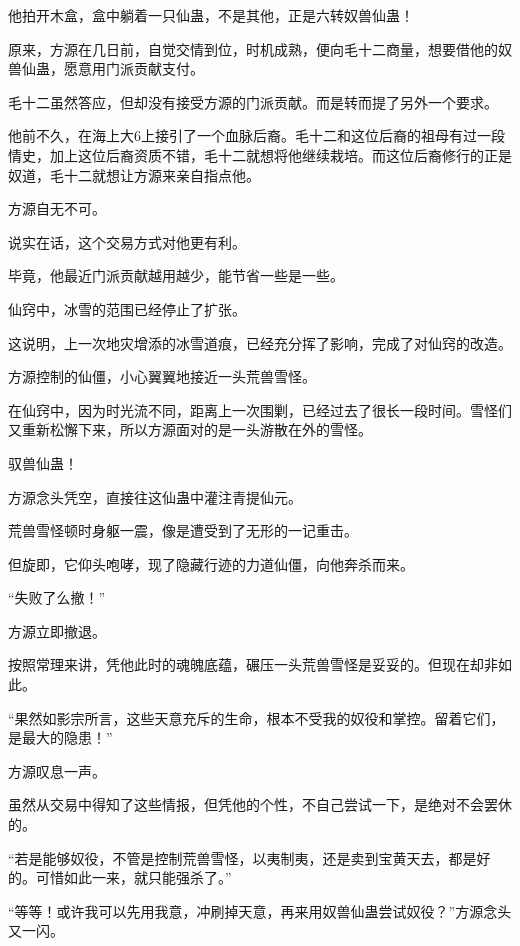 \begin{this_body}
他拍开木盒，盒中躺着一只仙蛊，不是其他，正是六转奴兽仙蛊！

原来，方源在几日前，自觉交情到位，时机成熟，便向毛十二商量，想要借他的奴兽仙蛊，愿意用门派贡献支付。

毛十二虽然答应，但却没有接受方源的门派贡献。而是转而提了另外一个要求。

他前不久，在海上大6上接引了一个血脉后裔。毛十二和这位后裔的祖母有过一段情史，加上这位后裔资质不错，毛十二就想将他继续栽培。而这位后裔修行的正是奴道，毛十二就想让方源来亲自指点他。

方源自无不可。

说实在话，这个交易方式对他更有利。

毕竟，他最近门派贡献越用越少，能节省一些是一些。

仙窍中，冰雪的范围已经停止了扩张。

这说明，上一次地灾增添的冰雪道痕，已经充分挥了影响，完成了对仙窍的改造。

方源控制的仙僵，小心翼翼地接近一头荒兽雪怪。

在仙窍中，因为时光流不同，距离上一次围剿，已经过去了很长一段时间。雪怪们又重新松懈下来，所以方源面对的是一头游散在外的雪怪。

驭兽仙蛊！

方源念头凭空，直接往这仙蛊中灌注青提仙元。

荒兽雪怪顿时身躯一震，像是遭受到了无形的一记重击。

但旋即，它仰头咆哮，现了隐藏行迹的力道仙僵，向他奔杀而来。

“失败了么撤！”

方源立即撤退。

按照常理来讲，凭他此时的魂魄底蕴，碾压一头荒兽雪怪是妥妥的。但现在却非如此。

“果然如影宗所言，这些天意充斥的生命，根本不受我的奴役和掌控。留着它们，是最大的隐患！”

方源叹息一声。

虽然从交易中得知了这些情报，但凭他的个性，不自己尝试一下，是绝对不会罢休的。

“若是能够奴役，不管是控制荒兽雪怪，以夷制夷，还是卖到宝黄天去，都是好的。可惜如此一来，就只能强杀了。”

“等等！或许我可以先用我意，冲刷掉天意，再来用奴兽仙蛊尝试奴役？”方源念头又一闪。

\end{this_body}

